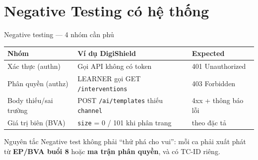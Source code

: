 \documentclass[aspectratio=169,12pt]{beamer}
\begin{document}
\section{Negative Testing có hệ thống}

\begin{frame}{Negative testing --- 4 nhóm cần phủ}
  \begin{center}
  \small
  \setlength{\tabcolsep}{4pt}
  \begin{tabular}{p{2.9cm}p{4.6cm}p{3.5cm}}
    \toprule
    \textbf{Nhóm} & \textbf{Ví dụ DigiShield} & \textbf{Expected} \\
    \midrule
    Xác thực (authn) & Gọi API không có token & 401 Unauthorized \\
    Phân quyền (authz) & LEARNER gọi GET \texttt{/interventions} & 403 Forbidden \\
    Body thiếu/sai trường & POST \texttt{/ai/templates} thiếu \texttt{channel} & 4xx + thông báo lỗi \\
    Giá trị biên (BVA) & \texttt{size} = 0 / 101 khi phân trang & theo đặc tả \\
    \bottomrule
  \end{tabular}
  \end{center}

  \begin{alertblock}{Nguyên tắc}
    Negative test không phải ``thử phá cho vui'': mỗi ca phải xuất phát từ
    \textbf{EP/BVA buổi 8} hoặc \textbf{ma trận phân quyền}, và có TC-ID riêng.
  \end{alertblock}
\end{frame}
\end{document}
